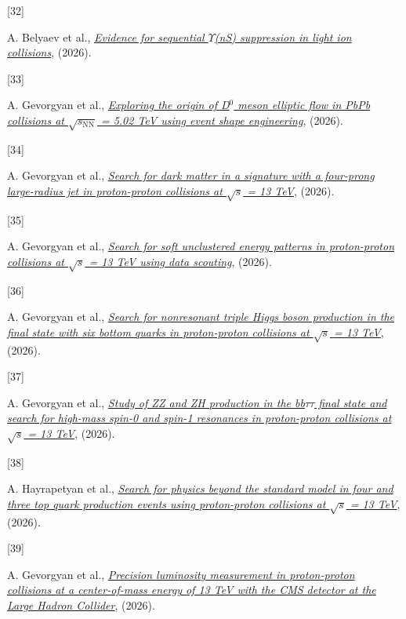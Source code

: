 \documentclass[
]{article}
\newlength{\cslhangindent}
\newlength{\csllabelwidth}
\newenvironment{CSLReferences}[2] %
 {\begin{list}{}{%
  \setlength{\itemindent}{0pt}
  \setlength{\leftmargin}{0pt}
  \setlength{\parsep}{0pt}
  \ifodd #1
   \setlength{\leftmargin}{\cslhangindent}
   \setlength{\itemindent}{-1\cslhangindent}
  \fi
  \setlength{\itemsep}{#2\baselineskip}}}
 {\end{list}}
\newcommand{\CSLLeftMargin}[1]{\parbox[t]{\csllabelwidth}{\strut#1\strut}}
\newcommand{\CSLRightInline}[1]{\parbox[t]{\linewidth - \csllabelwidth}{\strut#1\strut}}
\let\oldUpsilon\Upsilon
\renewcommand{\Upsilon}{\ensuremath{\oldUpsilon}}
\begin{document}
\begin{CSLReferences}{0}{0}
\CSLLeftMargin{{[}32{]} }%
\CSLRightInline{A. Belyaev et al.,
\emph{\href{https://arxiv.org/abs/2607.13758}{{Evidence for sequential
\(\ensuremath{\Upsilon}\)(nS) suppression in light ion collisions}}}, (2026).}

\CSLLeftMargin{{[}33{]} }%
\CSLRightInline{A. Gevorgyan et al.,
\emph{\href{https://arxiv.org/abs/2607.11017}{{Exploring the origin of
D\(^0\) meson elliptic flow in PbPb collisions at
\(\sqrt{s_\mathrm{NN}}\) = 5.02 TeV using event shape engineering}}},
(2026).}

\CSLLeftMargin{{[}34{]} }%
\CSLRightInline{A. Gevorgyan et al.,
\emph{\href{https://arxiv.org/abs/2607.11016}{{Search for dark matter in
a signature with a four-prong large-radius jet in proton-proton
collisions at \(\sqrt{s}\) = 13 TeV}}}, (2026).}

\CSLLeftMargin{{[}35{]} }%
\CSLRightInline{A. Gevorgyan et al.,
\emph{\href{https://arxiv.org/abs/2607.09621}{{Search for soft
unclustered energy patterns in proton-proton collisions at \(\sqrt{s}\)
= 13 TeV using data scouting}}}, (2026).}

\CSLLeftMargin{{[}36{]} }%
\CSLRightInline{A. Gevorgyan et al.,
\emph{\href{https://arxiv.org/abs/2607.05145}{{Search for nonresonant
triple Higgs boson production in the final state with six bottom quarks
in proton-proton collisions at \(\sqrt{s}\) = 13 TeV}}}, (2026).}

\CSLLeftMargin{{[}37{]} }%
\CSLRightInline{A. Gevorgyan et al.,
\emph{\href{https://arxiv.org/abs/2607.01589}{{Study of ZZ and ZH
production in the bb\(\ensuremath{\tau}\ensuremath{\tau}\) final state and search for high-mass spin-0
and spin-1 resonances in proton-proton collisions at \(\sqrt{s}\) = 13
TeV}}}, (2026).}

\CSLLeftMargin{{[}38{]} }%
\CSLRightInline{A. Hayrapetyan et al.,
\emph{\href{https://arxiv.org/abs/2606.30862}{{Search for physics beyond
the standard model in four and three top quark production events using
proton-proton collisions at \(\sqrt{s}\) = 13 TeV}}}, (2026).}

\CSLLeftMargin{{[}39{]} }%
\CSLRightInline{A. Gevorgyan et al.,
\emph{\href{https://arxiv.org/abs/2606.26832}{{Precision luminosity
measurement in proton-proton collisions at a center-of-mass energy of 13
TeV with the CMS detector at the Large Hadron Collider}}}, (2026).}


\end{CSLReferences}
\end{document}

